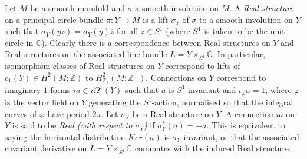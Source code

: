 \documentclass{amsart}
\theoremstyle{definition}
\theoremstyle{remark}
\numberwithin{equation}{section}
\begin{document}
Let $M$ be a smooth manifold and $\sigma$ a smooth involution on $M$. A {\em Real structure} on a principal circle bundle $\pi : Y \to M$ is a lift $\sigma_Y$ of $\sigma$ to a smooth involution on $Y$ such that $\sigma_Y( yz) = \sigma_Y(y)\overline{z}$ for all $z \in S^1$ (where $S^1$ is taken to be the unit circle in $\mathbb{C}$). Clearly there is a correspondence between Real structures on $Y$ and Real structures on the associated line bundle $L = Y \times_{S^1} \mathbb{C}$. In particular, isomorphism classes of Real structures on $Y$ correspond to lifts of $c_1(Y) \in H^2(M ; \mathbb{Z})$ to $H^2_{\mathbb{Z}_2}(M ; \mathbb{Z}_-)$. Connections on $Y$ correspond to imaginary $1$-forms $i a \in i \Omega^1(Y)$ such that $a$ is $S^1$-invariant and $\iota_{\varphi} a = 1$, where $\varphi$ is the vector field on $Y$ generating the $S^1$-action, normalised so that the integral curves of $\varphi$ have period $2\pi$. Let $\sigma_Y$ be a Real structure on $Y$. A connection $ia$ on $Y$ is said to be {\em Real (with respect to $\sigma_Y$)} if $\sigma_Y^*(a) = -a$. This is equivalent to saying the horizontal distribution $Ker(a)$ is $\sigma_Y$-invariant, or that the associated covariant derivative on $L = Y \times_{S^1} \mathbb{C}$ commutes with the induced Real structure.
\end{document}

